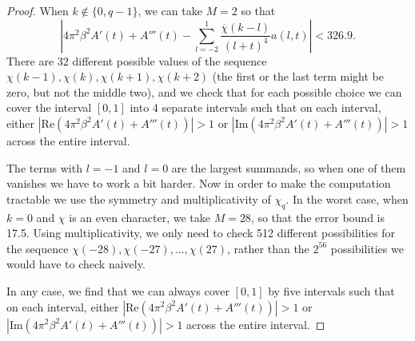 \documentclass[12pt, a4paper]{amsart}
\theoremstyle{remark}
\newcommand{\abs}[1]{\left|#1\right|}
\newcommand{\real}{\mathrm{Re}}
\newcommand{\imag}{\mathrm{Im}}
\newcommand{\chibar}{\overline \chi}
\begin{document}
\begin{proof}
When $k \not \in \{0, q-1\}$, we can take $M = 2$ so that
\[
    \abs{4\pi^2\beta^2 A'(t) + A'''(t) - 
    \sum_{l = -2}^1 \frac{\chibar(k-l)}{(l+t)^4} a(l,t)}
    < 326.9.
\]
There are 32 different possible values of the sequence
$\chi(k-1), \chi(k), \chi(k+1), \chi(k+2)$ (the first or the last term might
be zero, but not the middle two), and we check that for each possible choice
we can cover the interval $[0,1]$ into 4 separate intervals such that
on each interval, either $\abs{\real(4\pi^2\beta^2 A'(t) + A'''(t))} > 1$
or $\abs{\imag(4\pi^2\beta^2 A'(t) + A'''(t))} > 1$ across the entire
interval.

The terms with $l = -1$ and $l=0$ are the largest summands, so when one
of them vanishes we have to work a bit harder. Now in order to make the
computation tractable we use the symmetry and multiplicativity of $\chi_q$.
In the worst case, when $k=0$ and $\chi$ is an even character, we take $M =
28$, so that the error bound is 17.5. Using multiplicativity, we only need
to check 512 different possibilities for the sequence $\chi(-28), \chi(-27),
\ldots, \chi(27)$, rather than the $2^{56}$ possibilities we would have to
check naively.

In any case, we find that we can always cover $[0,1]$ by five intervals such that
on each interval, either $\abs{\real(4\pi^2\beta^2 A'(t) + A'''(t))} > 1$ or
$\abs{\imag(4\pi^2\beta^2 A'(t) + A'''(t))} > 1$ across the entire interval.


\end{proof}
\end{document}
